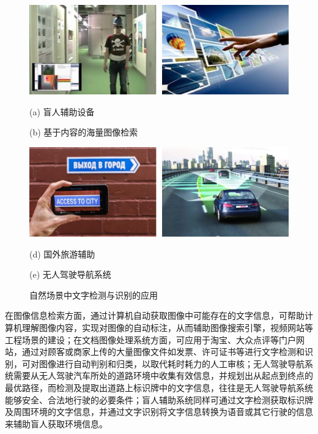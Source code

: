     \begin{figure}[!h]
    \centering
    \includegraphics[width=\textwidth]{./figures/c1_apply_1.jpg}
    \begin{minipage}[t]{0.48\linewidth}
    \centerline{ \small (a) 盲人辅助设备}
    \end{minipage}
    \begin{minipage}[t]{0.48\linewidth}
    \centerline{ \small (b) 基于内容的海量图像检索}
    \end{minipage}
    \includegraphics[width=\textwidth]{./figures/c1_apply_2.jpg}
    \begin{minipage}[t]{0.48\linewidth}
    \centerline{ \small (d) 国外旅游辅助}
    \end{minipage}
    \begin{minipage}[t]{0.48\linewidth}
    \centerline{ \small (e) 无人驾驶导航系统}
    \end{minipage}
    \caption{自然场景中文字检测与识别的应用}
    \label{fig.c1_apply}
    \end{figure}

    在图像信息检索方面，通过计算机自动获取图像中可能存在的文字信息，可帮助计算机理解图像内容，实现对图像的自动标注，从而辅助图像搜索引擎，视频网站等工程场景的建设；在文档图像处理系统方面，可应用于淘宝、大众点评等门户网站，通过对顾客或商家上传的大量图像文件如发票、许可证书等进行文字检测和识别，可对图像进行自动判别和归类，以取代耗时耗力的人工审核；无人驾驶导航系统需要从无人驾驶汽车所处的道路环境中收集有效信息，并规划出从起点到终点的最优路径，而检测及提取出道路上标识牌中的文字信息，往往是无人驾驶导航系统能够安全、合法地行驶的必要条件；盲人辅助系统同样可通过文字检测获取标识牌及周围环境的文字信息，并通过文字识别将文字信息转换为语音或其它行驶的信息来辅助盲人获取环境信息。

